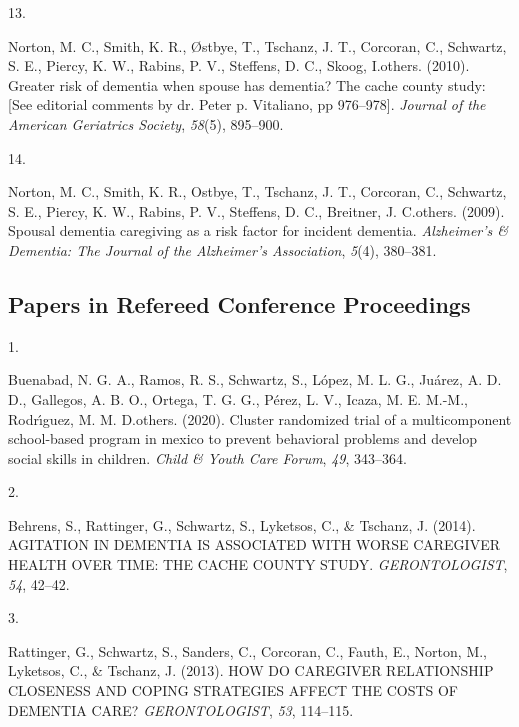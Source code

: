 \documentclass[11pt,a4paper,]{moderncv}
\newlength{\csllabelwidth}
\newcommand{\CSLLeftMargin}[1]{\parbox[t]{\csllabelwidth}{#1}}
\newcommand{\CSLRightInline}[1]{\parbox[t]{\linewidth - \csllabelwidth}{#1}}
\begin{document}
\leavevmode{}%
\CSLLeftMargin{13. }
\CSLRightInline{Norton, M. C., Smith, K. R., Østbye, T., Tschanz, J. T.,
Corcoran, C., Schwartz, S. E., Piercy, K. W., Rabins, P. V., Steffens,
D. C., Skoog, I.others. (2010). Greater risk of dementia when spouse has
dementia? The cache county study: {[}See editorial comments by dr. Peter
p. Vitaliano, pp 976--978{]}. \emph{Journal of the American Geriatrics
Society}, \emph{58}(5), 895--900.}

\leavevmode{}%
\CSLLeftMargin{14. }
\CSLRightInline{Norton, M. C., Smith, K. R., Ostbye, T., Tschanz, J. T.,
Corcoran, C., Schwartz, S. E., Piercy, K. W., Rabins, P. V., Steffens,
D. C., Breitner, J. C.others. (2009). Spousal dementia caregiving as a
risk factor for incident dementia. \emph{Alzheimer's \& Dementia: The
Journal of the Alzheimer's Association}, \emph{5}(4), 380--381.}

\clearpage

\hypertarget{papers-in-refereed-conference-proceedings}{%
\subsection{\texorpdfstring{\textbf{Papers in Refereed Conference
Proceedings}}{Papers in Refereed Conference Proceedings}}\label{papers-in-refereed-conference-proceedings}}

\hypertarget{refs_proceedings}{}
\leavevmode{}%
\CSLLeftMargin{1. }
\CSLRightInline{Buenabad, N. G. A., Ramos, R. S., Schwartz, S., López,
M. L. G., Juárez, A. D. D., Gallegos, A. B. O., Ortega, T. G. G., Pérez,
L. V., Icaza, M. E. M.-M., Rodrı́guez, M. M. D.others. (2020). Cluster
randomized trial of a multicomponent school-based program in mexico to
prevent behavioral problems and develop social skills in children.
\emph{Child \& Youth Care Forum}, \emph{49}, 343--364.}

\leavevmode{}%
\CSLLeftMargin{2. }
\CSLRightInline{Behrens, S., Rattinger, G., Schwartz, S., Lyketsos, C.,
\& Tschanz, J. (2014). AGITATION IN DEMENTIA IS ASSOCIATED WITH WORSE
CAREGIVER HEALTH OVER TIME: THE CACHE COUNTY STUDY.
\emph{GERONTOLOGIST}, \emph{54}, 42--42.}

\leavevmode{}%
\CSLLeftMargin{3. }
\CSLRightInline{Rattinger, G., Schwartz, S., Sanders, C., Corcoran, C.,
Fauth, E., Norton, M., Lyketsos, C., \& Tschanz, J. (2013). HOW DO
CAREGIVER RELATIONSHIP CLOSENESS AND COPING STRATEGIES AFFECT THE COSTS
OF DEMENTIA CARE? \emph{GERONTOLOGIST}, \emph{53}, 114--115.}
\end{document}
